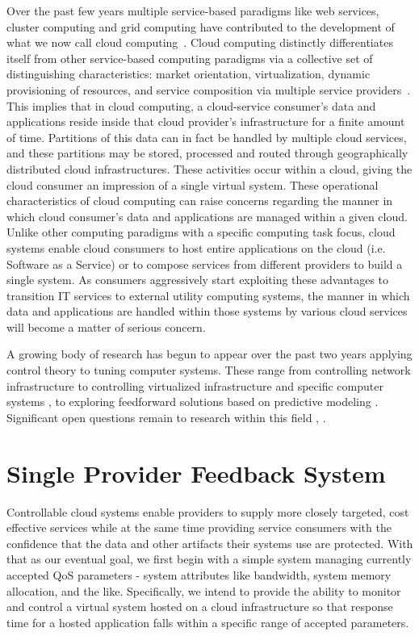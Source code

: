 \documentclass[times, 10pt,twocolumn]{article}
\begin{document}
Over the past few years multiple service-based paradigms like web services, cluster computing and grid computing have contributed to the development of what we now call cloud computing~\cite{Bu:09}. Cloud computing distinctly differentiates itself from other service-based computing paradigms via a collective set of distinguishing characteristics:  market orientation, virtualization, dynamic provisioning of resources, and service composition via multiple service providers~\cite{BuYeVeBrBr:09}. This implies that in cloud computing, a cloud-service consumer's data and applications reside inside that cloud provider's infrastructure for a finite amount of time.  Partitions of this data can in fact be handled by multiple cloud services, and these partitions may be stored, processed and routed through geographically distributed cloud infrastructures. These activities occur within a cloud, giving the cloud consumer an impression of a single virtual system.  These operational characteristics of cloud computing can raise concerns regarding the manner in which cloud consumer's data and applications are managed within a given cloud. Unlike other computing paradigms with a specific computing task focus, cloud systems enable cloud consumers to host entire applications on the cloud (i.e. Software as a Service) or to compose services from different providers to build a single system. As consumers aggressively start exploiting these advantages to transition IT services to external utility computing systems, the manner in which data and applications are handled within those systems by various cloud services will become a matter of serious concern.

A growing body of research has begun to appear over the past two years applying control theory to tuning computer systems.  These range from controlling network infrastructure \cite{ctrl:ariba-GL:2009} to controlling virtualized infrastructure and specific computer systems \cite{ctrl:wang-cgswrzh:2009}, \cite{ctrl:kjaer-kr:2009} to exploring feedforward solutions based on predictive modeling \cite{ctrl:abdelwahed-bsk:2009}.  Significant open questions remain to research within this field \cite{ctrl:Zhu:2009:CTB:1496909.1496922}, \cite{ctrl:hellerstein-sw:2009}.

\section{Single Provider Feedback System}\label{sec:single}
Controllable cloud systems enable providers to supply more closely targeted, cost effective services while at the same time providing service consumers with the confidence that the data and other artifacts their systems use are protected.  With that as our eventual goal, we first begin with a simple system managing currently accepted QoS parameters - system attributes like bandwidth, system memory allocation, and the like.  Specifically, we intend to provide the ability to monitor and control a virtual system hosted on a cloud infrastructure so that response time for a hosted application falls within a specific range of accepted parameters.
\end{document}
